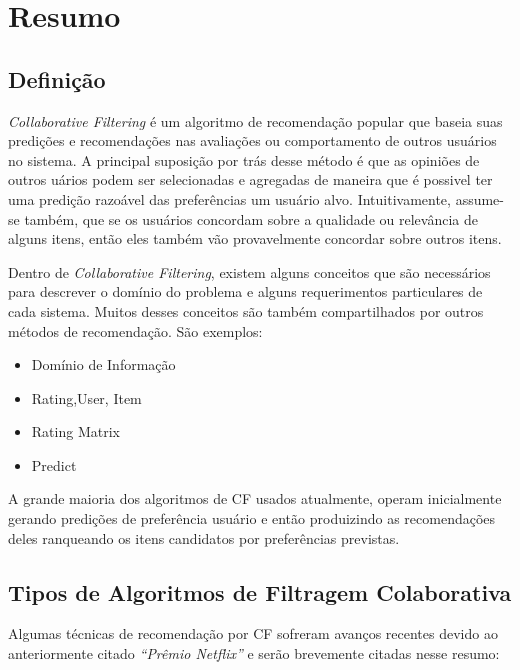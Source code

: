 \section{Resumo}

\subsection{Definição}
\par
\textit{Collaborative Filtering} é um algoritmo de recomendação popular que baseia suas predições e recomendações nas avaliações ou comportamento de outros usuários no sistema. A principal suposição por trás desse método é que as opiniões de outros uários podem ser selecionadas e agregadas de maneira que é possivel ter uma predição razoável das preferências um usuário alvo. Intuitivamente, assume-se também, que se os usuários concordam sobre a qualidade ou relevância de alguns itens, então eles também vão provavelmente concordar sobre outros itens.
\par
Dentro de \textit{Collaborative Filtering}, existem alguns conceitos que são necessários para descrever o domínio do problema e alguns requerimentos particulares de cada sistema. Muitos desses conceitos são também compartilhados por outros métodos de recomendação. São exemplos:

\begin{itemize}

  \item Domínio de Informação
  \item Rating,User, Item
  \item Rating Matrix
  \item Predict

\end{itemize}

\par
A grande maioria dos algoritmos de CF usados atualmente, operam inicialmente gerando predições de preferência usuário e então produizindo as recomendações deles ranqueando os itens candidatos por preferências previstas.

\subsection{Tipos de Algoritmos de Filtragem Colaborativa}

\par
Algumas técnicas de recomendação por CF sofreram avanços recentes devido ao anteriormente citado \textit{``Prêmio Netflix''} e serão brevemente citadas nesse resumo:


